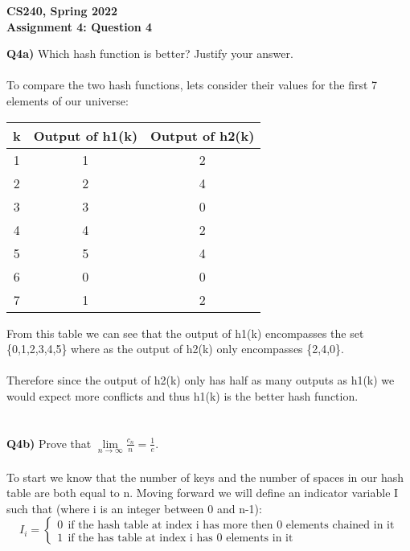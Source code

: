 \documentclass[12pt]{article}
\begin{document}
\begin{center}
{\Large\textbf{CS240, Spring 2022}}\\
\vspace{2mm}
{\Large\textbf{Assignment 4: Question 4}}\\
\vspace{3mm}
\end{center}
\begin{adjustwidth}{0em}{0pt}
\textbf{Q4a)} Which hash function is better? Justify your answer.\\\\
To compare the two hash functions, lets consider their values for the first 7 elements of our universe:
\begin{center}
\begin{tabular}{||c | c c||}
	\hline
    k & Output of h1(k) & Output of h2(k) \\
    \hline\hline
    1 & 1 & 2 \\
    \hline
    2 & 2 & 4 \\
    \hline
    3 & 3 & 0 \\
    \hline
    4 & 4 & 2 \\
    \hline
    5 & 5 & 4 \\
    \hline
    6 & 0 & 0 \\
    \hline
    7 & 1 & 2 \\
    \hline
\end{tabular}
\end{center}
From this table we can see that the output of h1(k) encompasses the set \{0,1,2,3,4,5\} where as the output of h2(k) only encompasses \{2,4,0\}. \\\\
Therefore since the output of h2(k) only has half as many outputs as h1(k) we would expect more conflicts and thus h1(k) is the better hash function. \\\\\\
\textbf{Q4b)} Prove that $\lim\limits_{n\to \infty}\frac{c_n}{n} = \frac{1}{e}$.\\\\
To start we know that the number of keys and the number of spaces in our hash table are both equal to n. Moving forward we will define an indicator variable I such that (where i is an integer between 0 and n-1):
\[ I_i = \begin{cases}
0 \ \ \text{if the hash table at index i has more then 0 elements chained in it} \\
1 \ \ \text{if the has table at index i has 0 elements in it}

\end{cases}\]
\end{adjustwidth}
\end{document}
